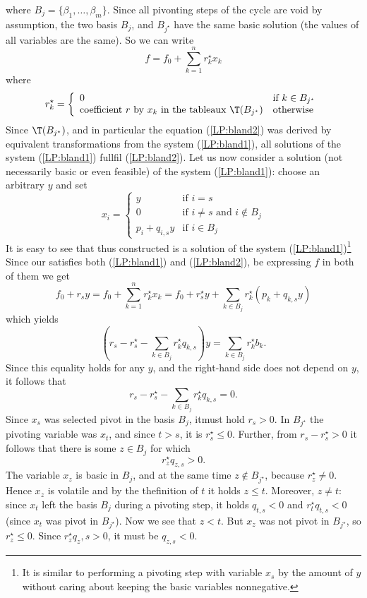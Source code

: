 \begin{dokaz}
\noindent
where  $B_j=\{\beta_1,\ldots,\beta_m\}$. 
Since all  pivonting steps of the cycle are void by assumption, the two basis  $B_j$, and $B_{j^\star}$
have the same basic solution (\ie the values of all variables are the same). So we can write
\begin{equation}
  \label{LP:bland2}
  f = f_0 + \sum_{k=1}^nr^\star_kx_k
\end{equation}
where
$$r^\star_k=\left\{\begin{array}{ll}0&\text{if $k\in B_{j^\star}$}\\\text{coefficient $r$ by $x_k$ 
in the tableaux $\T(B_{j^\star})$}&\text{otherwise}\end{array}\right.$$
%
Since $\T(B_{j^\star})$, and in particular the equation (\ref{LP:bland2}) 
was derived by equivalent transformations from the system
(\ref{LP:bland1}), all solutions of the system
(\ref{LP:bland1}) fullfil (\ref{LP:bland2}). 
Let us now consider a solution (not necessarily basic or even feasible) of the system 
(\ref{LP:bland1}):
choose an arbitrary $y$ and set
$$
x_i=\left\{\begin{array}{ll}%
    y&\text{if $i=s$}\\
    0&\text{if $i\not=s$ and $i\not\in B_j$}\\
    p_i+q_{i,s}y&\text{if $i\in B_j$}
  \end{array}\right.
  $$
%
It is easy to see that thus constructed  is a solution of the system  (\ref{LP:bland1})\footnote{
It is similar to performing a  pivoting step with variable  $x_s$ by the amount of $y$ without caring about
keeping the basic variables nonnegative.}
Since our  satisfies both  (\ref{LP:bland1})  and  (\ref{LP:bland2}), be expressing $f$ in both of
them we get
$$
f_0 + r_sy = f_0 + \sum_{k=1}^nr^\star_kx_k = f_0 + r^\star_sy + \sum_{k\in B_j}r^\star_k(p_k+q_{k,s}y)
$$
which yields
$$
\left(r_s-r^\star_s-\sum_{k\in B_j}r^\star_kq_{k,s}\right)y=\sum_{k\in B_j}r^\star_kb_k
.$$
%
Since this equality holds for any $y$, and the right-hand side does not depend on $y$, it follows that
$$
r_s-r^\star_s-\sum_{k\in B_j}r^\star_kq_{k,s}=0
.$$
%
Since $x_s$ was selected pivot in the basis $B_j$, itmust hold  $r_s>0$. In  $B_{j^\star}$
the pivoting variable was  $x_t$, and since  $t>s$, it is $r^\star_s\le 0$. Further, from 
 $r_s-r^\star_s>0$ it follows that there is some $z\in B_j$ for which
$$
r^\star_zq_{z,s}>0
.$$
The variable $x_z$ is basic in $B_j$, and at the same time $z\not\in B_{j^\star}$, because $r^\star_z\not=0$.
Hence $x_z$ is volatile and by the thefinition of $t$ it holds  $z\le t$.
Moreover, $z\not=t$: since $x_t$ left the basis $B_j$ during a pivoting step, it holds 
 $q_{t,s}<0$ and  $r^\star_tq_{t,s}<0$ (since $x_t$ was pivot in  $B_{j^\star}$).
Now we see that  $z<t$. But $x_z$ was not pivot in $B_{j^\star}$, so  $r^\star_z\le0$.
Since  $r^\star_zq_z,s>0$, it must be $q_{z,s}<0$.



\end{dokaz}
